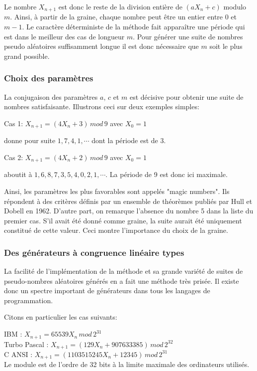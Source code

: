 \documentclass{scrartcl}
\begin{document}
Le nombre $X_{n+1}$ est donc le reste de la division entière de $(a X_n +c)$
modulo $m$. Ainsi, à partir de la graine, chaque nombre peut être un entier
entre 0 et $m-1$.  Le caractère déterministe de la méthode fait apparaître une
période qui est dans le meilleur des cas de longueur $m$.  Pour générer une
suite de nombres pseudo aléatoires suffisamment longue il est donc nécessaire
que $m$ soit le plus grand possible.

\subsubsection{Choix des paramètres}
La conjugaison des paramètres $a$, $c$ et $m$ est décisive pour obtenir une
suite de nombres satisfaisante. Illustrons ceci sur deux exemples simples:\par

Cas 1: $X_{n+1} = (4 X_n + 3)\, mod\, 9$ avec $X_0 = 1$\par
donne pour suite $1,7,4,1, \cdots$ dont la période est de 3.\par
Cas 2: $X_{n+1} = (4 X_n +2)\, mod\, 9$ avec $X_0 = 1$\par
aboutit à $1,6,8,7,3,5,4,0,2,1, \cdots$. La période de 9 est donc ici maximale.\par

Ainsi, les paramètres les plus favorables sont appelés "magic numbers". Ils
répondent à des critères définis par un ensemble de théorèmes publiés par Hull
et Dobell en 1962.  D'autre part, on remarque l'absence du nombre 5 dans la
liste du premier cas. S'il avait été donné comme graine, la suite aurait été
uniquement constitué de cette valeur. Ceci montre l'importance du choix de la
graine.

\subsubsection{Des générateurs à congruence linéaire types}

La facilité de l'implémentation de la méthode et sa grande variété de suites de
pseudo-nombres aléatoires générés en a fait une méthode très prisée.  Il existe
donc un spectre important de générateurs dans tous les langages de
programmation.\par
Citons en particulier les cas suivants:\par
IBM : $X_{n+1} =65539 X_{n}\, mod\, 2^{31}$\\
Turbo Pascal : $X_{n+1} =(129 X_{n} + 907633385)\, mod\, 2^{32}$\\
C ANSI : $X_{n+1} =(1103515245 X_{n}+12345)\, mod\, 2^{31}$\\
Le module est de l'ordre de 32 bits à la limite maximale des ordinateurs
utilisés.
\end{document}
